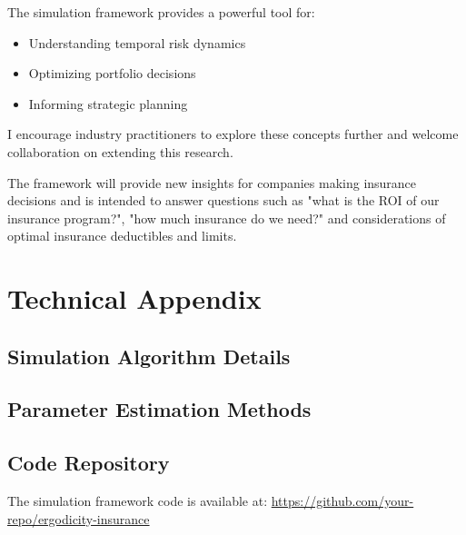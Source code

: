 \documentclass[11pt,letterpaper]{article}
\begin{document}
The simulation framework provides a powerful tool for:
\begin{itemize}
    \item Understanding temporal risk dynamics
    \item Optimizing portfolio decisions
    \item Informing strategic planning
\end{itemize}

I encourage industry practitioners to explore these concepts further and welcome collaboration on extending this research.

The framework will provide new insights for companies making insurance decisions and is intended to answer questions such as "what is the ROI of our insurance program?", "how much insurance do we need?" and considerations of optimal insurance deductibles and limits.




\appendix
\section{Technical Appendix}

\subsection{Simulation Algorithm Details}


\subsection{Parameter Estimation Methods}


\subsection{Code Repository}

The simulation framework code is available at: \url{https://github.com/your-repo/ergodicity-insurance}
\end{document}
